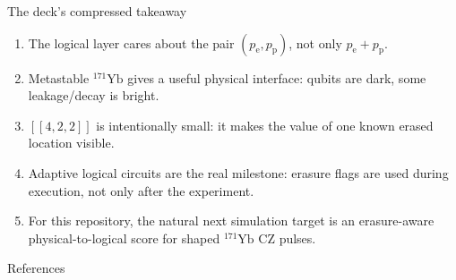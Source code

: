 \documentclass[aspectratio=169,11pt]{beamer}
\newcommand{\pe}{p_{\mathrm e}}
\newcommand{\pp}{p_{\mathrm p}}
\begin{document}
\begin{frame}{The deck's compressed takeaway}
  \begin{enumerate}
    \item The logical layer cares about the pair \((\pe,\pp)\), not only \(\pe+\pp\).
    \item Metastable \(^{171}\mathrm{Yb}\) gives a useful physical interface:
      qubits are dark, some leakage/decay is bright.
    \item \([[4,2,2]]\) is intentionally small: it makes the value of one known
      erased location visible.
    \item Adaptive logical circuits are the real milestone: erasure flags are
      used during execution, not only after the experiment.
    \item For this repository, the natural next simulation target is an
      erasure-aware physical-to-logical score for shaped \(^{171}\mathrm{Yb}\)
      CZ pulses.
  \end{enumerate}
\end{frame}

\begin{frame}[allowframebreaks]{References}
  \printbibliography
\end{frame}
\end{document}
